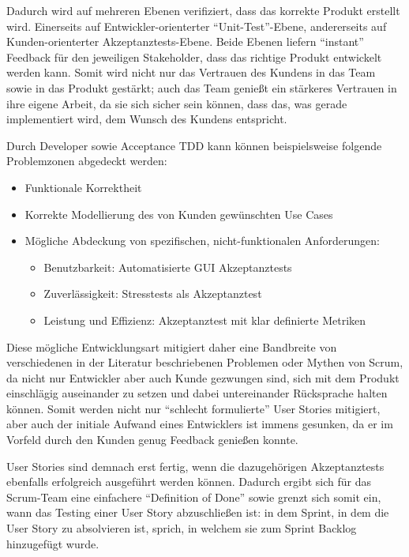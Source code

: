\documentclass[12pt,DIV14,BCOR10mm,a4paper,twoside,parskip=half-,headsepline,headinclude,english,ngerman,bibliography=totocnumbered]{scrreprt}
\begin{document}
Dadurch wird auf mehreren Ebenen verifiziert, dass das korrekte Produkt erstellt wird.
Einerseits auf Entwickler-orienterter \enquote{Unit-Test}-Ebene, andererseits auf Kunden-orienterter Akzeptanztests-Ebene.
Beide Ebenen liefern \enquote{instant} Feedback für den jeweiligen Stakeholder, dass das richtige Produkt entwickelt werden kann.
Somit wird nicht nur das Vertrauen des Kundens in das Team sowie in das Produkt gestärkt; auch das Team genießt ein stärkeres Vertrauen in ihre eigene Arbeit, da sie sich sicher sein können, dass das, was gerade implementiert wird, dem Wunsch des Kundens entspricht.

Durch Developer sowie Acceptance TDD kann können beispielsweise folgende Problemzonen abgedeckt werden:
\begin{itemize}
  \item Funktionale Korrektheit
  \item Korrekte Modellierung des von Kunden gewünschten Use Cases
  \item Mögliche Abdeckung von spezifischen, nicht-funktionalen Anforderungen:
  \begin{itemize}
    \item Benutzbarkeit: Automatisierte GUI Akzeptanztests
    \item Zuverlässigkeit: Stresstests als Akzeptanztest
    \item Leistung und Effizienz: Akzeptanztest mit klar definierte Metriken
  \end{itemize}
\end{itemize}

Diese mögliche Entwicklungsart mitigiert daher eine Bandbreite von verschiedenen in der Literatur beschriebenen Problemen oder Mythen von Scrum, da nicht nur Entwickler aber auch Kunde gezwungen sind, sich mit dem Produkt einschlägig auseinander zu setzen und dabei untereinander Rücksprache halten können.
Somit werden nicht nur \enquote{schlecht formulierte} User Stories mitigiert, aber auch der initiale Aufwand eines Entwicklers ist immens gesunken, da er im Vorfeld durch den Kunden genug Feedback genießen konnte.

User Stories sind demnach erst fertig, wenn die dazugehörigen Akzeptanztests ebenfalls erfolgreich ausgeführt werden können.
Dadurch ergibt sich für das Scrum-Team eine einfachere \enquote{Definition of Done} sowie grenzt sich somit ein, wann das Testing einer User Story abzuschließen ist: in dem Sprint, in dem die User Story zu absolvieren ist, sprich, in welchem sie zum Sprint Backlog hinzugefügt wurde.
\end{document}

